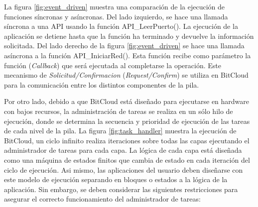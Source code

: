La figura \ref{fig:event_driven} muestra una comparación de la ejecución de funciones síncronas y asíncronas. Del lado izquierdo, se hace una llamada síncrona a una API usando la función API\_LeerPuerto(). La ejecución de la aplicación se detiene hasta que la función ha terminado y devuelve la información solicitada. Del lado derecho de la figura \ref{fig:event_driven} se hace una llamada asíncrona a la función API\_IniciarRed(). Esta función recibe como parámetro la función (\textit{Callback}) que será ejecutada al completarse la operación. Este mecanismo de \textit{Solicitud/Confirmacion} (\textit{Request/Confirm}) se utiliza en BitCloud para la comunicación entre los distintos componentes de la pila. 



Por otro lado, debido a que BitCloud está diseñado para ejecutarse en hardware con bajos recursos, la administración de tareas se realiza en un sólo hilo de ejecución, donde se determina la secuencia y prioridad de ejecución de las tareas de cada nivel de la pila. La figura \ref{fig:task_handler} muestra la ejecución de BitCloud, un ciclo infinito realiza iteraciones sobre todas las capas ejecutando el administrador de tareas para cada capa. La lógica de cada capa está diseñada como una máquina de estados finitos que cambia de estado en cada iteración del ciclo de ejecución. Asi mismo, las aplicaciones del usuario deben diseñarse con este modelo de ejecución separando en bloques o estados a la lógica de la aplicación. Sin embargo, se deben considerar las siguientes restricciones para asegurar el correcto funcionamiento del administrador de tareas: 


